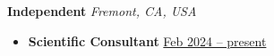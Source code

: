 {\color{red}\textbf{Independent} \hfill \textit{Fremont, CA, USA}}\par
\begin{itemize}
    \item
        \textbf{Scientific Consultant}
        \hfill \underline{Feb 2024 -- present} \par
\end{itemize}